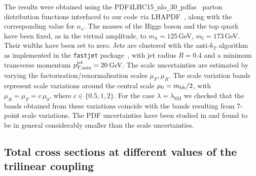 
The results were obtained using the
PDF4LHC15{\tt\_}nlo{\tt\_}30{\tt\_}pdfas~\cite{Butterworth:2015oua,CT14,MMHT14,NNPDF}
parton distribution functions interfaced to our code via
LHAPDF~\cite{Buckley:2014ana}, along with the corresponding value for
$\alpha_s$.  The masses of the Higgs boson and the top quark have been
fixed, as in the virtual amplitude, to $m_h=125$\,GeV, $m_t=173$\,GeV. Their widths have been set to zero.   
Jets are clustered with the
anti-$k_T$ algorithm~\cite{Cacciari:2008gp} as implemented in the
{\tt fastjet} package~\cite{Cacciari:2005hq, Cacciari:2011ma}, with jet
radius $R=0.4$ and a minimum transverse momentum 
$p_{T,\mathrm{min}}^{\rm{jet}}=20$\,GeV.  The scale uncertainties are
estimated by varying the factorisation/renormalisation scales
$\mu_{F}, \mu_{R}$. The scale variation bands 
represent scale variations around the central scale $\mu_0 =m_{\mathrm{hh}}/2$, with
$\mu_{R} = \mu_{F}=c\,\mu_0$, where $c \in \{0.5,1,2\}$.
For the case $\lambda=\lambda_{\mathrm{SM}}$ we checked that the bands
obtained from these variations coincide with the bands resulting from
7-point scale variations. The PDF uncertainties have been studied in
\cite{deFlorian:2016spz} and found to be in general considerably smaller than the scale uncertainties.

\subsection{Total cross sections at different values of the trilinear coupling}

